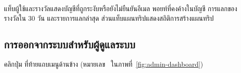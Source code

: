 แท็บผู้ใช้และรางวัลแสดงบัญชีที่ถูกระงับหรือยังไม่ยืนยันอีเมล พอยท์ที่คงค้างในบัญชี การแลกของรางวัลใน 30 วัน และรายการแลกล่าสุด ส่วนแท็บแผนทริปแสดงสถิติการสร้างแผนทริป

\subsection{การออกจากระบบสำหรับผู้ดูแลระบบ}

\begin{steps}
  \item คลิกปุ่ม  ที่ท้ายแถบเมนูด้านข้าง (หมายเลข~ ในภาพที่~\ref{fig:admin-dashboard})
\end{steps}
